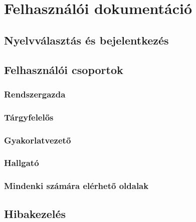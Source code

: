 \chapter{Felhasználói dokumentáció} %
\label{ch:user}

\section{Nyelvválasztás és bejelentkezés}
\section{Felhasználói csoportok}
\subsection{Rendszergazda}
\subsection{Tárgyfelelős}
\subsection{Gyakorlatvezető}
\subsection{Hallgató}
\subsection{Mindenki számára elérhető oldalak}
\section{Hibakezelés}
